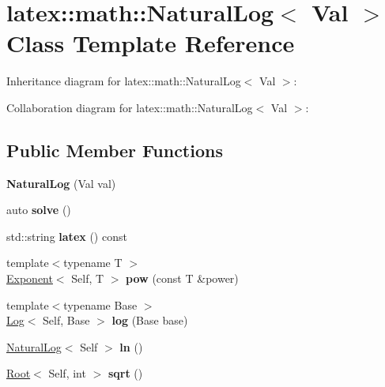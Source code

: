 \hypertarget{classlatex_1_1math_1_1NaturalLog}{\section{latex\-:\-:math\-:\-:\-Natural\-Log$<$ \-Val $>$ \-Class \-Template \-Reference}
\label{classlatex_1_1math_1_1NaturalLog}
}


\-Inheritance diagram for latex\-:\-:math\-:\-:\-Natural\-Log$<$ \-Val $>$\-:


\-Collaboration diagram for latex\-:\-:math\-:\-:\-Natural\-Log$<$ \-Val $>$\-:
\subsection*{\-Public \-Member \-Functions}
\begin{DoxyCompactItemize}
\item 
\hypertarget{classlatex_1_1math_1_1NaturalLog_aeeb12e56e32d76ced7fbd41e82941d0f}{{\bfseries \-Natural\-Log} (\-Val val)}\label{classlatex_1_1math_1_1NaturalLog_aeeb12e56e32d76ced7fbd41e82941d0f}

\item 
\hypertarget{classlatex_1_1math_1_1NaturalLog_ad4ffac52939e962b891122008b323abf}{auto {\bfseries solve} ()}\label{classlatex_1_1math_1_1NaturalLog_ad4ffac52939e962b891122008b323abf}

\item 
\hypertarget{classlatex_1_1math_1_1NaturalLog_af75e70ab4e10082741e89127ead0a32b}{std\-::string {\bfseries latex} () const }\label{classlatex_1_1math_1_1NaturalLog_af75e70ab4e10082741e89127ead0a32b}

\item 
\hypertarget{classlatex_1_1math_1_1NaturalLog_a94d5f44f2bb1000ae0a969cccc781bb4}{{\footnotesize template$<$typename T $>$ }\\\hyperlink{classlatex_1_1math_1_1Exponent}{\-Exponent}$<$ \-Self, \-T $>$ {\bfseries pow} (const \-T \&power)}\label{classlatex_1_1math_1_1NaturalLog_a94d5f44f2bb1000ae0a969cccc781bb4}

\item 
\hypertarget{classlatex_1_1math_1_1NaturalLog_abea6ea1be29c3e5bbbabbcf758a79fbf}{{\footnotesize template$<$typename Base $>$ }\\\hyperlink{classlatex_1_1math_1_1Log}{\-Log}$<$ \-Self, \-Base $>$ {\bfseries log} (\-Base base)}\label{classlatex_1_1math_1_1NaturalLog_abea6ea1be29c3e5bbbabbcf758a79fbf}

\item 
\hypertarget{classlatex_1_1math_1_1NaturalLog_ae8720764dd2a28eae1133eb7d5e584b8}{\hyperlink{classlatex_1_1math_1_1NaturalLog}{\-Natural\-Log}$<$ \-Self $>$ {\bfseries ln} ()}\label{classlatex_1_1math_1_1NaturalLog_ae8720764dd2a28eae1133eb7d5e584b8}

\item 
\hypertarget{classlatex_1_1math_1_1NaturalLog_aa73f79ce7b2acb561a8bc190d585c7a8}{\hyperlink{classlatex_1_1math_1_1Root}{\-Root}$<$ \-Self, int $>$ {\bfseries sqrt} ()}\label{classlatex_1_1math_1_1NaturalLog_aa73f79ce7b2acb561a8bc190d585c7a8}

\end{DoxyCompactItemize}
